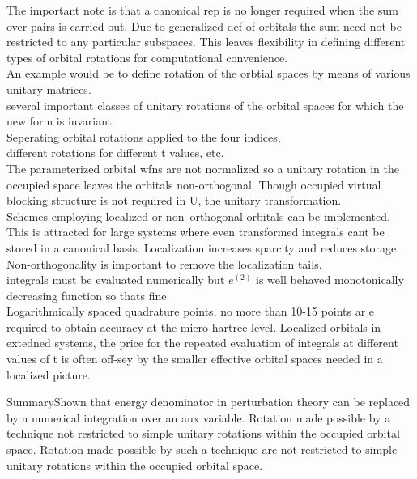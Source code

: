 \documentclass[10pt, draft]{article}
\begin{document}
The important note is that a canonical rep is no longer required when the sum over pairs is carried out.  Due to generalized def of orbitals the sum need not be restricted to any particular subspaces. This leaves flexibility in defining different types of orbital rotations for computational convenience.  \\
An example would be to define rotation of the orbtial spaces by means of various unitary matrices.  \\
several important classes of unitary rotations of the orbital spaces for which the new form is invariant.  \\
Seperating orbital rotations applied to the four indices,\\
different rotations for different t values, etc.\\
The parameterized orbital wfns are not normalized so a unitary rotation in the occupied space leaves the orbitals non-orthogonal. Though occupied virtual blocking structure is not required in U, the unitary transformation.  \\
Schemes employing localized or non--orthogonal orbitals can be implemented.  This is attracted for large systems where even transformed integrals cant be stored in a canonical basis. Localization increases sparcity and reduces storage.  Non-orthogonality is important to remove the localization tails.\\
integrals must be evaluated numerically but $e^{(2)}$ is well behaved monotonically decreasing function so thats fine.  \\
Logarithmically spaced quadrature points, no more than 10-15 points ar e required to obtain accuracy at the micro-hartree level.  Localized orbitals in extedned systems, the price for the repeated evaluation of integrals at different values of t is often off-sey by the smaller effective orbital spaces needed in a localized picture.\linebreak[1]

Summary\linebreak[1]
Shown that energy denominator in perturbation theory can be replaced by a numerical integration over an aux variable. Rotation made possible by a technique not restricted to simple unitary rotations within the occupied orbital space. Rotation made possible by such a technique are not restricted to simple unitary rotations within the occupied orbital space.  
\end{document}
